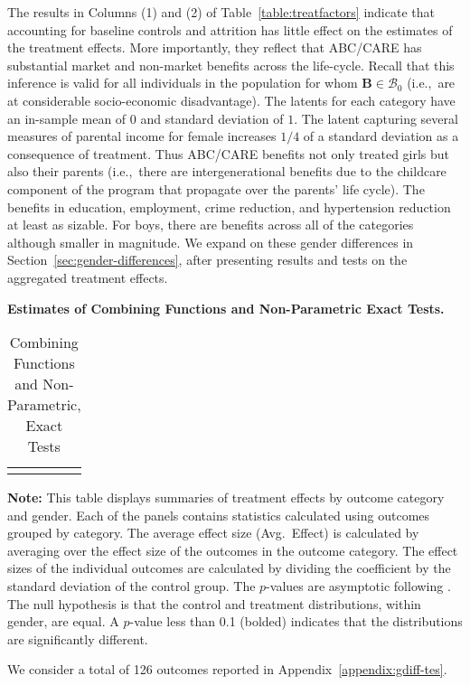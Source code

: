 The results in  Columns (1) and (2) of Table~\ref{table:treatfactors} indicate that accounting for baseline controls and attrition has little effect on the estimates of the treatment effects. More importantly, they reflect that ABC/CARE has substantial market and non-market benefits across the life-cycle. Recall that this inference is valid for all individuals in the population for whom $\bm{B} \in \mathcal{B}_0$ (i.e.,\ are at considerable socio-economic disadvantage). The latents for each category have an in-sample mean of $0$ and standard deviation of $1$. The latent capturing several measures of parental income for female increases $1/4$ of a standard deviation as a consequence of treatment. Thus ABC/CARE benefits not only treated girls but also their parents (i.e.,\ there are intergenerational benefits due to the childcare component of the program that propagate over the parents' life cycle). The benefits in education, employment, crime reduction, and hypertension reduction at least as sizable. For boys, there are benefits across all of the categories although smaller in magnitude. We expand on these gender differences in Section~\ref{sec:gender-differences}, after presenting results and tests on the aggregated treatment effects.

\textbf{Estimates of Combining Functions and Non-Parametric Exact Tests.} 

\begin{table}[!htpb]
\begin{threeparttable}
\caption{Combining Functions and Non-Parametric, Exact Tests} \label{table:massiveall}
\centering
\begin{tabularx}{16.75cm}{XcX}
&  & 
\end{tabularx}
\begin{tablenotes}
\footnotesize
\item \textbf{Note:} This table displays summaries of treatment effects by outcome category and gender. Each of the panels contains statistics calculated using outcomes grouped by category. The average effect size (Avg.\ Effect) is calculated by averaging over the effect size of the outcomes in the outcome category. The effect sizes of the individual outcomes are calculated by dividing the coefficient by the standard deviation of the control group. The $p$-values are asymptotic following \citet{Rosenbaum_2005_Distribution_JRSS}. The null hypothesis is that the control and treatment distributions, within gender, are equal. A $p$-value less than 0.1 (bolded) indicates that the distributions are significantly different. 
\end{tablenotes}
\end{threeparttable}
\end{table}




We consider a total of 126 outcomes reported in Appendix~\ref{appendix:gdiff-tes}. 

